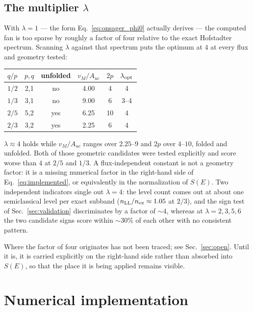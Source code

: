 \documentclass[11pt]{article}
\begin{document}
\subsection{The multiplier \texorpdfstring{$\lambda$}{lambda}}
\label{sec:lambda}

With $\lambda = 1$ --- the form Eq.~\eqref{eq:onsager_phi0} actually
derives --- the computed fan is too sparse by roughly a factor of four
relative to the exact Hofstadter spectrum.  Scanning $\lambda$ against
that spectrum puts the optimum at $4$ at every flux and geometry tested:

\begin{center}
\begin{tabular}{lccccc}
\toprule
$q/p$ & $p,q$ & unfolded & $v_M/A_{uc}$ & $2p$ & $\lambda_{\rm opt}$ \\
\midrule
$1/2$ & 2,1 & no  & 4.00 & 4  & 4 \\
$1/3$ & 3,1 & no  & 9.00 & 6  & 3--4 \\
$2/5$ & 5,2 & yes & 6.25 & 10 & 4 \\
$2/3$ & 3,2 & yes & 2.25 & 6  & 4 \\
\bottomrule
\end{tabular}
\end{center}

\noindent
$\lambda \approx 4$ holds while $v_M/A_{uc}$ ranges over $2.25$--$9$ and
$2p$ over $4$--$10$, folded and unfolded.  Both of those geometric
candidates were tested explicitly and score worse than $4$ at $2/5$ and
$1/3$.  A flux-independent constant is not a geometry factor: it is a
missing numerical factor in the right-hand side of
Eq.~\eqref{eq:implemented}, or equivalently in the normalization of
$S(E)$.  Two independent indicators single out $\lambda = 4$: the level
count comes out at about one semiclassical level per exact subband
($n_{\rm LL}/n_{\rm ex} \approx 1.05$ at $2/3$), and the sign test of
Sec.~\ref{sec:validation} discriminates by a factor of $\sim\!4$, whereas
at $\lambda = 2,3,5,6$ the two candidate signs score within ${\sim}30\%$
of each other with no consistent pattern.

Where the factor of four originates has not been traced; see
Sec.~\ref{sec:open}.  Until it is, it is carried explicitly on the
right-hand side rather than absorbed into $S(E)$, so that the place it is
being applied remains visible.

\section{Numerical implementation}\label{sec:numerics}
\end{document}
